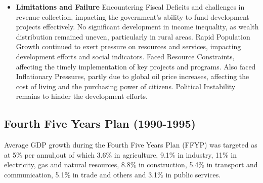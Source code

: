 \begin{itemize}
	\item\textbf{Limitations and Failure}
	Encountering Fiscal Deficits and challenges in revenue collection, impacting the government's 
	ability to fund development projects effectively. No significant development in income inequality, 
	as wealth distribution remained uneven, particularly in rural areas. Rapid Population Growth 
	continued to exert pressure on resources and services, impacting development efforts and social indicators.
	Faced Resource Constraints, affecting the timely implementation of key projects and programs.
	Also faced Inflationary Pressures, partly due to global oil price increases, affecting the cost
	of living and the purchasing power of citizens. Political Instability remains to hinder the development efforts.
	
\end{itemize}


\subsection{Fourth Five Years Plan (1990-1995)}
Average GDP growth during the Fourth Five Years Plan (FFYP) was targeted as at 5\% per
annul,out of which 3.6\% in agriculture, 9.1\% in industry, 11\% in electricity, gas and natural
resources, 8.8\% in construction, 5.4\% in transport and communication, 5.1\% in trade and
others and 3.1\% in public services.

